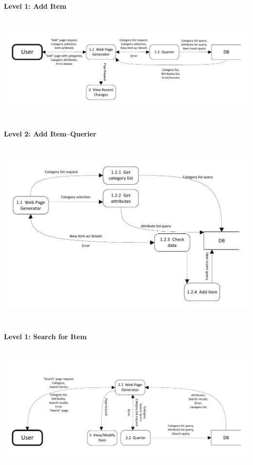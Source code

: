\documentclass{article}
\begin{document}
\paragraph{Level 1: Add Item}
~\\
\includegraphics[keepaspectratio, width=6.5in]{dfd_level1_add_item.pdf}\\
~\\

\paragraph{Level 2: Add Item--Querier}
~\\
\includegraphics[keepaspectratio, width=6.5in]{dfd_level2_add_item_querier.pdf}\\
~\\

\paragraph{Level 1: Search for Item}
~\\
\includegraphics[keepaspectratio, width=6.5in]{dfd_level1_search_for_item.pdf}\\
~\\
\end{document}
